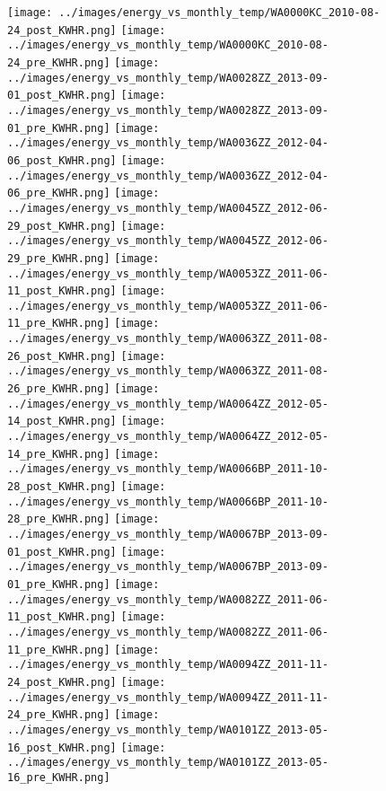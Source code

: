 \clearpage
\begin{figure}
\centering
\texttt{[image: ../images/energy\_vs\_monthly\_temp/WA0000KC\_2010-08-24\_post\_KWHR.png]}
\texttt{[image: ../images/energy\_vs\_monthly\_temp/WA0000KC\_2010-08-24\_pre\_KWHR.png]}
\texttt{[image: ../images/energy\_vs\_monthly\_temp/WA0028ZZ\_2013-09-01\_post\_KWHR.png]}
\texttt{[image: ../images/energy\_vs\_monthly\_temp/WA0028ZZ\_2013-09-01\_pre\_KWHR.png]}
\texttt{[image: ../images/energy\_vs\_monthly\_temp/WA0036ZZ\_2012-04-06\_post\_KWHR.png]}
\texttt{[image: ../images/energy\_vs\_monthly\_temp/WA0036ZZ\_2012-04-06\_pre\_KWHR.png]}
\texttt{[image: ../images/energy\_vs\_monthly\_temp/WA0045ZZ\_2012-06-29\_post\_KWHR.png]}
\texttt{[image: ../images/energy\_vs\_monthly\_temp/WA0045ZZ\_2012-06-29\_pre\_KWHR.png]}
\texttt{[image: ../images/energy\_vs\_monthly\_temp/WA0053ZZ\_2011-06-11\_post\_KWHR.png]}
\texttt{[image: ../images/energy\_vs\_monthly\_temp/WA0053ZZ\_2011-06-11\_pre\_KWHR.png]}
\texttt{[image: ../images/energy\_vs\_monthly\_temp/WA0063ZZ\_2011-08-26\_post\_KWHR.png]}
\texttt{[image: ../images/energy\_vs\_monthly\_temp/WA0063ZZ\_2011-08-26\_pre\_KWHR.png]}
\texttt{[image: ../images/energy\_vs\_monthly\_temp/WA0064ZZ\_2012-05-14\_post\_KWHR.png]}
\texttt{[image: ../images/energy\_vs\_monthly\_temp/WA0064ZZ\_2012-05-14\_pre\_KWHR.png]}
\texttt{[image: ../images/energy\_vs\_monthly\_temp/WA0066BP\_2011-10-28\_post\_KWHR.png]}
\texttt{[image: ../images/energy\_vs\_monthly\_temp/WA0066BP\_2011-10-28\_pre\_KWHR.png]}
\texttt{[image: ../images/energy\_vs\_monthly\_temp/WA0067BP\_2013-09-01\_post\_KWHR.png]}
\texttt{[image: ../images/energy\_vs\_monthly\_temp/WA0067BP\_2013-09-01\_pre\_KWHR.png]}
\texttt{[image: ../images/energy\_vs\_monthly\_temp/WA0082ZZ\_2011-06-11\_post\_KWHR.png]}
\texttt{[image: ../images/energy\_vs\_monthly\_temp/WA0082ZZ\_2011-06-11\_pre\_KWHR.png]}
\texttt{[image: ../images/energy\_vs\_monthly\_temp/WA0094ZZ\_2011-11-24\_post\_KWHR.png]}
\texttt{[image: ../images/energy\_vs\_monthly\_temp/WA0094ZZ\_2011-11-24\_pre\_KWHR.png]}
\texttt{[image: ../images/energy\_vs\_monthly\_temp/WA0101ZZ\_2013-05-16\_post\_KWHR.png]}
\texttt{[image: ../images/energy\_vs\_monthly\_temp/WA0101ZZ\_2013-05-16\_pre\_KWHR.png]}
\end{figure}
